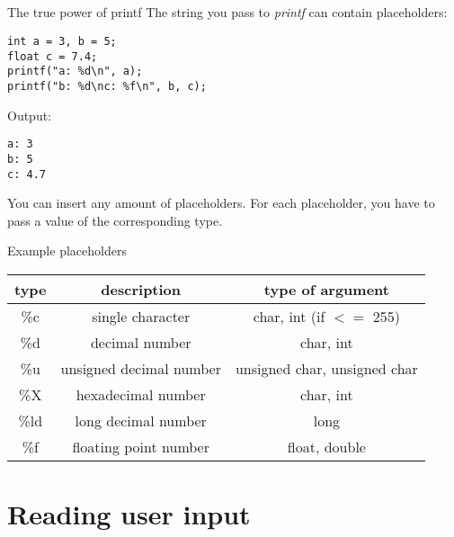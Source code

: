 \subsection{}
\begin{frame}[fragile]{The true power of printf}
	The string you pass to \textit{printf} can contain placeholders:
	\begin{lstlisting}[numbers=none]
int a = 3, b = 5;
float c = 7.4;
printf("a: %d\n", a);
printf("b: %d\nc: %f\n", b, c);
\end{lstlisting}
Output:\begin{lstlisting}[numbers=none]
a: 3
b: 5
c: 4.7
\end{lstlisting}
You can insert any amount of placeholders. For each placeholder, you have to pass a value of the corresponding type.
\end{frame}
\begin{frame}{Example placeholders}
	\begin{tabular}{|c|c|c|}
		\hline
		\textbf{type} & \textbf{description} & \textbf{type of argument} \\\hline
		\%c & single character & char, int (if $<=$ 255) \\\hline
		\%d & decimal number & char, int \\\hline
		\%u & unsigned decimal number & unsigned char, unsigned char \\\hline
		\%X & hexadecimal number & char, int \\\hline
		\%ld & long decimal number & long \\\hline
		\%f & floating point number & float, double \\\hline
	\end{tabular}
\end{frame}
\section{Reading user input}
